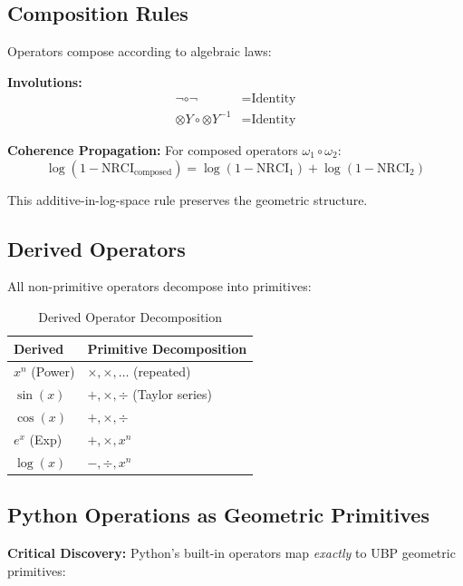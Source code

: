 \documentclass[12pt,a4paper]{article}
\begin{document}
\subsection{Composition Rules}

Operators compose according to algebraic laws:

\textbf{Involutions:}
\begin{align}
\neg \circ \neg &= \text{Identity} \\
\otimes Y \circ \otimes Y^{-1} &= \text{Identity}
\end{align}

\textbf{Coherence Propagation:} For composed operators $\omega_1 \circ \omega_2$:
\begin{equation}
\log(1 - \text{NRCI}_{\text{composed}}) = \log(1 - \text{NRCI}_1) + \log(1 - \text{NRCI}_2)
\end{equation}

This additive-in-log-space rule preserves the geometric structure.

\subsection{Derived Operators}

All non-primitive operators decompose into primitives:

\begin{table}[h]
\centering
\begin{tabular}{ll}
\toprule
\textbf{Derived} & \textbf{Primitive Decomposition} \\
\midrule
$x^n$ (Power) & $\times, \times, \ldots$ (repeated) \\
$\sin(x)$ & $+, \times, \div$ (Taylor series) \\
$\cos(x)$ & $+, \times, \div$ \\
$e^x$ (Exp) & $+, \times, x^n$ \\
$\log(x)$ & $-, \div, x^n$ \\
\bottomrule
\end{tabular}
\caption{Derived Operator Decomposition}
\label{tab:decomposition}
\end{table}

\subsection{Python Operations as Geometric Primitives}

\textbf{Critical Discovery:} Python's built-in operators map \emph{exactly} to UBP geometric primitives:
\end{document}
